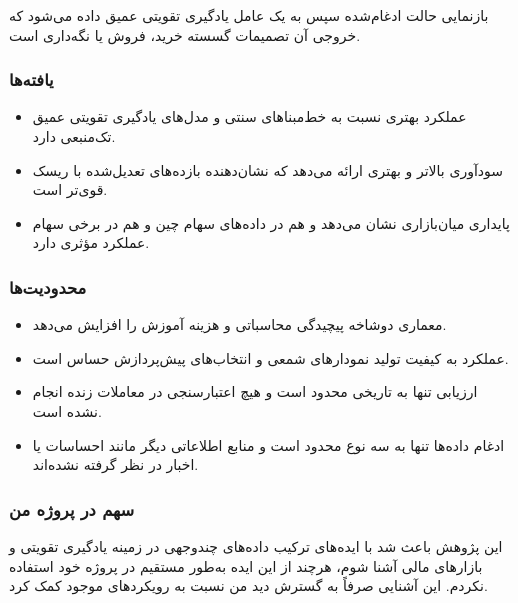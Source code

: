 \documentclass[12pt, a4paper]{report}
\begin{document}
بازنمایی حالت ادغام‌شده سپس به یک عامل یادگیری تقویتی عمیق داده می‌شود که خروجی آن تصمیمات گسسته خرید، فروش یا نگه‌داری است.

\subsubsection{یافته‌ها}
\begin{itemize}
    \item {} عملکرد بهتری نسبت به خط‌مبناهای سنتی و مدل‌های یادگیری تقویتی عمیق تک‌منبعی دارد.  
    \item سودآوری بالاتر و  بهتری ارائه می‌دهد که نشان‌دهنده بازده‌های تعدیل‌شده با ریسک قوی‌تر است.  
    \item پایداری میان‌بازاری نشان می‌دهد و هم در داده‌های سهام چین و هم در برخی سهام  عملکرد مؤثری دارد.  
\end{itemize}

\subsubsection{محدودیت‌ها}
\begin{itemize}
    \item معماری دو‌شاخه پیچیدگی محاسباتی و هزینه آموزش را افزایش می‌دهد.  
    \item عملکرد به کیفیت تولید نمودارهای شمعی و انتخاب‌های پیش‌پردازش حساس است.  
    \item ارزیابی تنها به  تاریخی محدود است و هیچ اعتبارسنجی در معاملات زنده انجام نشده است.  
    \item ادغام داده‌ها تنها به سه نوع محدود است و منابع اطلاعاتی دیگر مانند احساسات یا اخبار در نظر گرفته نشده‌اند.  
\end{itemize}


\subsubsection{سهم در پروژه من}
این پژوهش باعث شد با ایده‌های ترکیب داده‌های چندوجهی  در زمینه یادگیری تقویتی و بازارهای مالی آشنا شوم، هرچند از این ایده به‌طور مستقیم در پروژه خود استفاده نکردم. این آشنایی صرفاً به گسترش دید من نسبت به رویکردهای موجود کمک کرد.


\subsection{ \cite{koratamaddi2021sentiment}}
\end{document}
